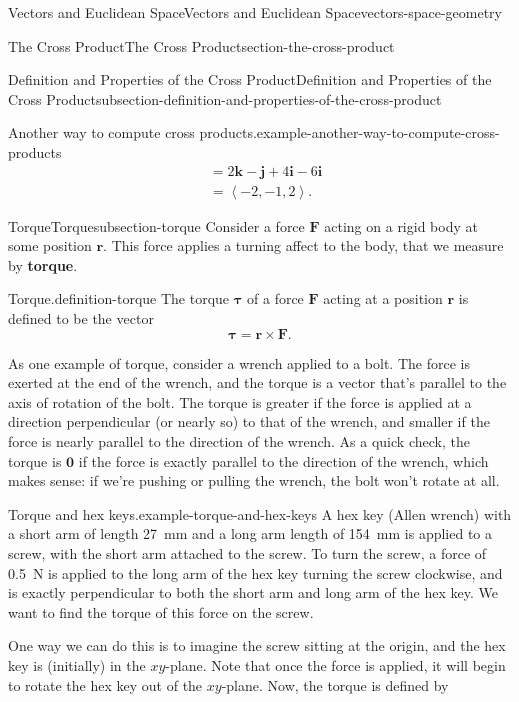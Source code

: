 \documentclass[oneside,10pt,]{book}
\newcommand{\terminology}[1]{\textbf{#1}}
\numberwithin{equation}{section}
\newcommand{\vv}[1]{\mathbf{#1}}
\newcommand{\dotprod}[1]{\left\langle #1 \right\rangle}
\begin{document}
\begin{chapterptx}{Vectors and Euclidean Space}{}{Vectors and Euclidean Space}{}{}{vectors-space-geometry}
\begin{sectionptx}{The Cross Product}{}{The Cross Product}{}{}{section-the-cross-product}
\begin{subsectionptx}{Definition and Properties of the Cross Product}{}{Definition and Properties of the Cross Product}{}{}{subsection-definition-and-properties-of-the-cross-product}
\begin{example}{Another way to compute cross products.}{example-another-way-to-compute-cross-products}
\begin{align*}
& = 2\vv{k}-\vv{j}+4\vv{i}-6\vv{i} \\
& = \dotprod{-2,-1,2}. 
\end{align*}
\end{example}
\end{subsectionptx}
%
%
\typeout{************************************************}
\typeout{************************************************}
%
\begin{subsectionptx}{Torque}{}{Torque}{}{}{subsection-torque}
\hypertarget{p-1191}{}%
Consider a force \(\vv{F}\) acting on a rigid body at some position \(\vv{r}\). This force applies a turning affect to the body, that we measure by \terminology{torque}.%
\begin{definition}{Torque.}{definition-torque}%
\hypertarget{p-1192}{}%
The torque \(\boldsymbol{\tau}\) of a force \(\vv{F}\) acting at a position \(\vv{r}\) is defined to be the vector%
%
\begin{equation*}
\boldsymbol{\tau} = \vv{r}\times\vv{F}.
\end{equation*}
\end{definition}
\hypertarget{p-1193}{}%
As one example of torque, consider a wrench applied to a bolt. The force is exerted at the end of the wrench, and the torque is a vector that's parallel to the axis of rotation of the bolt. The torque is greater if the force is applied at a direction perpendicular (or nearly so) to that of the wrench, and smaller if the force is nearly parallel to the direction of the wrench. As a quick check, the torque is \(\vv{0}\) if the force is exactly parallel to the direction of the wrench, which makes sense: if we're pushing or pulling the wrench, the bolt won't rotate at all.%
\begin{example}{Torque and hex keys.}{example-torque-and-hex-keys}%
\hypertarget{p-1194}{}%
A hex key (Allen wrench) with a short arm of length \SI{27}{\milli\meter} and a long arm length of \SI{154}{\milli\meter} is applied to a screw, with the short arm attached to the screw. To turn the screw, a force of \SI{0.5}{\newton} is applied to the long arm of the hex key turning the screw clockwise, and is exactly perpendicular to both the short arm and long arm of the hex key. We want to find the torque of this force on the screw.%
\par
\hypertarget{p-1195}{}%
One way we can do this is to imagine the screw sitting at the origin, and the hex key is (initially) in the \(xy\)-plane. Note that once the force is applied, it will begin to rotate the hex key out of the \(xy\)-plane. Now, the torque is defined by%

\end{example}
\end{subsectionptx}
\end{sectionptx}
\end{chapterptx}
\end{document}
